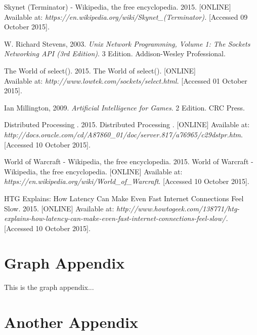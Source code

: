\documentclass[12pt,a4paper,titlepage]{article}
\begin{document}
\begin{thebibliography}{99}

Skynet (Terminator) - Wikipedia, the free encyclopedia. 2015. [ONLINE] Available at: \textit{https://en.wikipedia.org/wiki/Skynet\_(Terminator).} [Accessed 09 October 2015].

W. Richard Stevens, 2003. \textit{Unix Network Programming, Volume 1: The Sockets Networking API (3rd Edition)}. 3 Edition. Addison-Wesley Professional.

The World of select(). 2015. The World of select(). [ONLINE] \\
Available at: \textit{http://www.lowtek.com/sockets/select.html.} [Accessed 01 October 2015].

Ian Millington, 2009. \textit{Artificial Intelligence for Games}. 2 Edition. CRC Press.

Distributed Processing . 2015. Distributed Processing . [ONLINE] Available at: \textit{http://docs.oracle.com/cd/A87860\_01/doc/server.817/a76965/c29dstpr.htm}. [Accessed 10 October 2015].

World of Warcraft - Wikipedia, the free encyclopedia. 2015. World of Warcraft - Wikipedia, the free encyclopedia. [ONLINE] Available at: \textit{https://en.wikipedia.org/wiki/World\_of\_Warcraft}. [Accessed 10 October 2015].

HTG Explains: How Latency Can Make Even Fast Internet Connections Feel Slow. 2015. [ONLINE] Available at: \textit{http://www.howtogeek.com/138771/htg-explains-how-latency-can-make-even-fast-internet-connections-feel-slow/.} [Accessed 10 October 2015].

\end{thebibliography}



\newpage
\begin{appendices}

\section{Graph Appendix}
\label{appendix:graph}
This is the graph appendix...

\section{Another Appendix}

\end{appendices}
\end{document}
